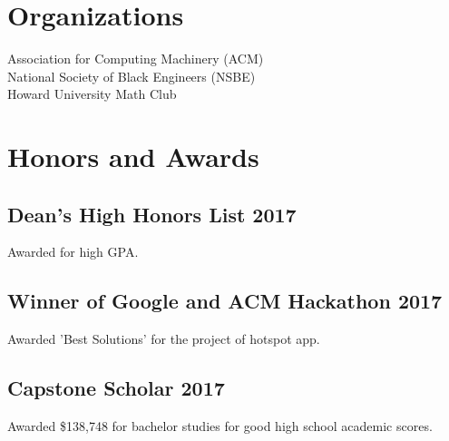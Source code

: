 \documentclass[]{deedy-resume-reversed}
\begin{document}
\begin{minipage}[t]{0.33\textwidth}
\sectionsep


\section{Organizations}
Association for Computing Machinery (ACM)\\
National Society of Black Engineers (NSBE) \\
Howard University Math Club \\
\sectionsep


\section{Honors and Awards}
\subsection{Dean's High Honors List 2017}
Awarded for high GPA. \\
\sectionsep

\subsection{Winner of Google and ACM Hackathon 2017}
Awarded 'Best Solutions' for the project of hotspot app. \\
\sectionsep

\subsection{Capstone Scholar 2017}
Awarded \$138,748 for bachelor studies for good high school academic scores. \\
\sectionsep

\end{minipage}
\end{document}
